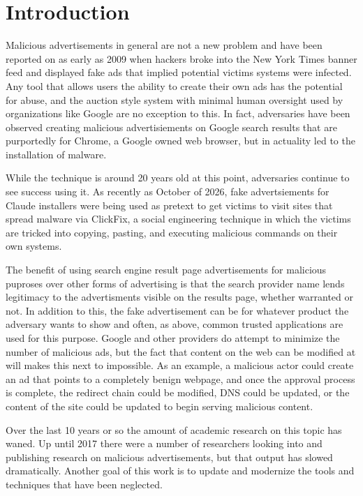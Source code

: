 \documentclass[sigconf]{acmart}
\begin{document}
\section{Introduction}
Malicious advertisements in general are not a new problem and have
been reported on as early as 2009 when hackers
broke into the New York Times banner feed and displayed fake ads that implied
potential victims systems were infected. \cite{picchi_2009_malvertising}
Any tool that allows users the ability to create their own ads has the potential
for abuse, and the auction style system with minimal human oversight used by
organizations like Google are no exception to this.
In fact, adversaries have been observed creating malicious advertisiements on
Google search results that are purportedly for Chrome, a Google owned web
browser, but in actuality led to the installation of malware.
\cite{peters_2016_gooogle_adwords}

While the technique is around 20 years old at this point, adversaries continue
to see success using it.
As recently as October of 2026, fake advertsiements for Claude installers were
being used as pretext to get victims to visit sites that spread malware via
ClickFix, a social engineering technique in which the victims are tricked into
copying, pasting, and executing malicious commands on their own systems.
\cite{abrams_2026_cluade_clickfix}

The benefit of using search engine result page advertisements for malicious
puproses over other forms of advertising is that the search provider name lends
legitimacy to the advertisments visible on the results page, whether warranted
or not.
In addition to this, the fake advertisement can be for whatever product the
adversary wants to show and often, as above, common trusted applications are
used for this purpose.
Google and other providers do attempt to minimize the number of malicious ads,
but the fact that content on the web can be modified at will makes this next to
impossible.
As an example, a malicious actor could create an ad that points to a completely
benign webpage, and once the approval process is complete, the redirect chain
could be modified, DNS could be updated, or the content of the site could be
updated to begin serving malicious content.

Over the last 10 years or so the amount of academic research on this topic has
waned.
Up until 2017 there were a number of researchers looking into and publishing
research on malicious advertisements, but that output has slowed dramatically.
Another goal of this work is to update and modernize the tools and techniques
that have been neglected.
\end{document}

